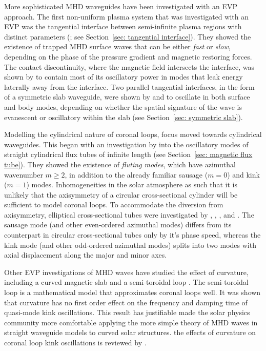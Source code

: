 \documentclass[12pt]{../style-files/ociamthesis}
\begin{document}
More sophisticated MHD waveguides have been investigated with an EVP approach. The first non-uniform plasma system that was investigated with an EVP was the tangential interface between semi-infinite plasma regions with distinct parameters (\citealp{rob81a}; see Section~\ref{sec: tangential interface}). They showed the existence of trapped MHD surface waves that can be either \textit{fast} or \textit{slow}, depending on the phase of the pressure gradient and magnetic restoring forces. The contact discontinuity, where the magnetic field intersects the interface, was shown by \cite{vic_etal18} to contain most of its oscillatory power in modes that leak energy laterally away from the interface. Two parallel tangential interfaces, in the form of a symmetric slab waveguide, were shown by \cite{rob81b} and \cite{edw_etal82} to oscillate in both surface and body modes, depending on whether the spatial signature of the wave is evanescent or oscillatory within the slab (see Section~\ref{sec: symmetric slab}).

Modelling the cylindrical nature of coronal loops, focus moved towards cylindrical waveguides. This began with an investigation by \cite{edw_etal83} into the oscillatory modes of straight cylindrical flux tubes of infinite length (see Section~\ref{sec: magnetic flux tube}). They showed the existence of \textit{fluting modes}, which have azimuthal wavenumber $m \geq 2$, in addition to the already familiar sausage ($m = 0$) and kink ($m = 1$) modes. Inhomogeneities in the solar atmosphere as such that it is unlikely that the axisymmetry of a circular cross-sectional cylinder will be sufficient to model coronal loops. To accommodate the diversion from axisymmetry, elliptical cross-sectional tubes were investigated by \cite{gu_etal80}, \cite{rud03}, \cite{erd_etal09}, and \cite{mor_etal11}. The sausage mode (and other even-ordered azimuthal modes) differs from its counterpart in circular cross-sectional tubes only by it's phase speed, whereas the kink mode (and other odd-ordered azimuthal modes) splits into two modes with axial displacement along the major and minor axes.

Other EVP investigations of MHD waves have studied the effect of curvature, including a curved magnetic slab \citep{ver_etal06a,ver_etal06b} and a semi-toroidal loop \cite{van_etal04}. The semi-toroidal loop is a mathematical model that approximates coronal loops well. It was shown that curvature has no first order effect on the frequency and damping time of quasi-mode kink oscillations. This result has justifiable made the solar physics community more comfortable applying the more simple theory of MHD waves in straight waveguide models to curved solar structures. the effects of curvature on coronal loop kink oscillations is reviewed by \cite{van_etal09}.
\end{document}
